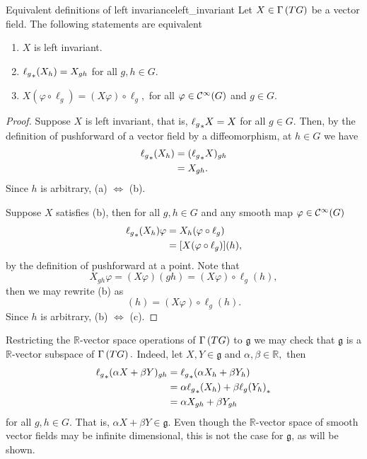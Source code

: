 \begin{proposition}{Equivalent definitions of left invariance}{left_invariant}
    Let \(X \in \Gamma\left(TG\right)\) be a vector field. The following statements are equivalent
    \begin{enumerate}[label=(\alph*)]
        \item \(X\) is left invariant.
        \item \({\ell_g}_{\ast{}}(X_h) = X_{gh}\) for all \(g,h \in G.\)
        \item \(X(\varphi \circ \ell_g) = (X\varphi) \circ \ell_g,\) for all \(\varphi \in \mathcal{C}^\infty(G)\) and \(g \in G.\)
    \end{enumerate}
\end{proposition}
\begin{proof}
    Suppose \(X\) is left invariant, that is, \({\ell_g}_{\ast{}}X = X\) for all \(g \in G\). Then, by the definition of pushforward of a vector field by a diffeomorphism, at \(h \in G\) we have
    \begin{align*}
        {\ell_g}_{\ast{}}(X_h) &= ({\ell_g}_{\ast{}}X)_{gh}\\
                            &= X_{gh}.
    \end{align*}
    Since \(h\) is arbitrary, (a) \(\iff\) (b).

    Suppose \(X\) satisfies (b), then for all \(g, h \in G\) and any smooth map \(\varphi \in \mathcal{C}^\infty(G)\)
    \begin{align*}
        {\ell_g}_{\ast{}}(X_h)\varphi &= X_h (\varphi \circ \ell_g)\\
                             &= [X(\varphi\circ \ell_g)](h),
    \end{align*}
    by the definition of pushforward at a point. Note that
    \begin{equation*}
        X_{gh}\varphi = (X\varphi)(gh) = (X \varphi)\circ \ell_g (h),
    \end{equation*}
    then we may rewrite (b) as
    \begin{equation*}
        [X(\varphi\circ \ell_g)](h) = (X\varphi)\circ \ell_g(h).
    \end{equation*}
    Since \(h\) is arbitrary, (b) \(\iff\) (c).
\end{proof}

Restricting the \(\mathbb{R}\)-vector space operations of \(\Gamma\left(TG\right)\) to \(\mathfrak{g}\) we may check that \(\mathfrak{g}\) is a \(\mathbb{R}\)-vector subspace of \(\Gamma\left(TG\right).\) Indeed, let \(X, Y \in \mathfrak{g}\) and \(\alpha, \beta \in \mathbb{R},\) then
\begin{align*}
    {\ell_g}_{\ast{}}(\alpha X + \beta Y)_{gh} &= {\ell_g}_{\ast{}}(\alpha X_h + \beta Y_h)\\
                                            &= \alpha {\ell_g}_{\ast{}}(X_h) + \beta {\ell_g(Y_h)}_{\ast{}}\\
                                            &= \alpha X_{gh} + \beta Y_{gh}
\end{align*}
for all \(g, h \in G.\) That is, \(\alpha X + \beta Y \in \mathfrak{g}\). Even though the \(\mathbb{R}\)-vector space of smooth vector fields may be infinite dimensional, this is not the case for \(\mathfrak{g}\), as will be shown.

